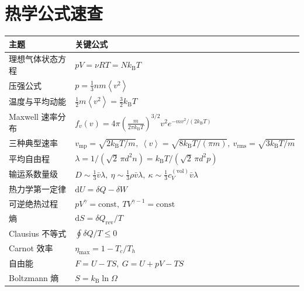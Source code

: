 \documentclass[11pt,a4paper,openany]{ctexbook}
\newcommand{\dd}{\mathrm d}
\newcommand{\kb}{k_{\mathrm B}}
\newcommand{\avg}[1]{\left\langle #1\right\rangle}
\newcommand{\rev}{\mathrm{rev}}
\newcommand{\const}{\mathrm{const}}
\begin{document}
\appendix
\chapter{热学公式速查}

\renewcommand{\arraystretch}{1.5}
\small
\noindent\begin{tabularx}{\textwidth}{@{}p{}X@{}}
\toprule
主题 & 关键公式 \\
\midrule
理想气体状态方程 & $pV=\nu RT=Nk_{\mathrm B}T$ \\
压强公式 & $p=\frac13nm\avg{v^2}$ \\
温度与平均动能 & $\frac12m\avg{v^2}=\frac32\kb T$ \\
Maxwell 速率分布 &
$f_v(v)=4\pi\left(\frac{m}{2\pi\kb T}\right)^{3/2}v^2e^{-mv^2/(2\kb T)}$ \\
三种典型速率 &
$v_{\mathrm{mp}}=\sqrt{2\kb T/m},\ \avg v=\sqrt{8\kb T/(\pi m)},\ v_{\mathrm{rms}}=\sqrt{3\kb T/m}$ \\
平均自由程 &
$\lambda=1/(\sqrt2\,\pi d^2n)=\kb T/(\sqrt2\,\pi d^2p)$ \\
输运系数量级 &
$D\sim \frac13\bar v\lambda,\ \eta\sim \frac13\rho\bar v\lambda,\ \kappa\sim \frac13c_V^{(\mathrm{vol})}\bar v\lambda$ \\
热力学第一定律 & $\dd U=\delta Q-\delta W$ \\
可逆绝热过程 & $pV^\gamma=\const,\ TV^{\gamma-1}=\const$ \\
熵 & $\dd S=\delta Q_{\rev}/T$ \\
Clausius 不等式 & $\oint \delta Q/T\le0$ \\
Carnot 效率 & $\eta_{\max}=1-T_c/T_h$ \\
自由能 & $F=U-TS,\ G=U+pV-TS$ \\
Boltzmann 熵 & $S=\kb\ln\Omega$ \\
\bottomrule
\end{tabularx}
\end{document}
